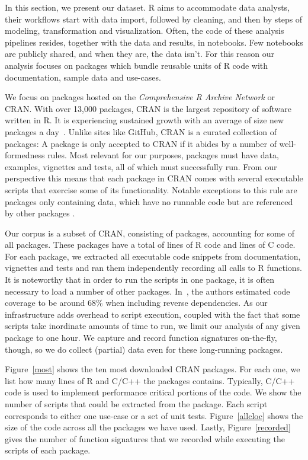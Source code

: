 \documentclass[acmsmall,10pt,review,anonymous]{acmart}\settopmatter{printfolios=true,printccs=false,printacmref=false}
\begin{document}
In this section, we present our dataset. R aims to accommodate data
analysts, their workflows start with data import, followed by cleaning, and
then by steps of modeling, transformation and visualization. Often, the code
of these analysis pipelines resides, together with the data and results, in
notebooks. Few notebooks are publicly shared, and when they are, the data
isn't. For this reason our analysis focuses on packages which bundle
reusable units of R code with documentation, sample data and use-cases.

We focus on packages hosted on the \emph{Comprehensive R Archive Network} or
CRAN.  With over 13,000 packages, CRAN is the largest repository of software
written in R. It is experiencing sustained growth with an average of size
new packages a day~\cite{LIgges2017}.  Unlike sites like GitHub, CRAN is a
curated collection of packages: A package is only accepted to CRAN if it
abides by a number of well-formedness rules.  Most relevant for our
purposes, packages must have data, examples, vignettes and tests, all of
which must successfully run. From our perspective this means that each
package in CRAN comes with several executable scripts that exercise some of
its functionality.  Notable exceptions to this rule are packages only
containing data, which have no runnable code but are referenced by other
packages .

Our corpus is a subset of CRAN, consisting of \PACKAGES packages, accounting
for some \PERCENTCRAN of all packages.  These packages have a total of \RLOC
lines of R code and \CLOC lines of C code. For each package, we extracted
all executable code snippets from documentation, vignettes and tests and ran
them independently recording all calls to R functions.  It is noteworthy that
in order to run the scripts in one package, it is often necessary to load a
number of other packages.  In~\cite{issta18}, the authors estimated code
coverage to be around 68\% when including reverse dependencies.  As our infrastructure
adds overhead to script execution, coupled with the fact that some scripts take 
inordinate amounts of time to run, we limit our analysis of any given package to one hour.
We capture and record function signatures on-the-fly, though, so we do collect (partial) data even 
for these long-running packages. 

Figure~\ref{most} shows the ten most downloaded CRAN packages.  For each
one, we list how many lines of R and C/C++ the packages contains.
Typically, C/C++ code is used to implement performance critical portions of
the code. We show the number of scripts that could be extracted from the
package. Each script corresponds to either one use-case or a set of unit
tests.  Figure~\ref{allcloc} shows the size of the code across all the
packages we have used.  Lastly, Figure~\ref{recorded} gives the number of
function signatures that we recorded while executing the scripts of each
package.
\end{document}
